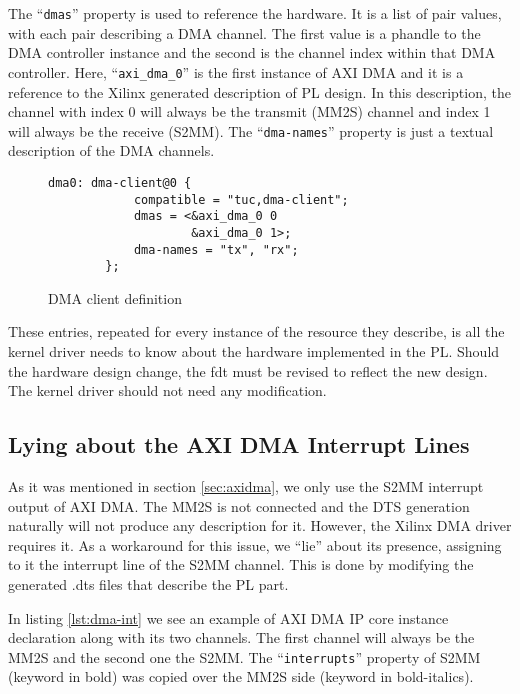 The ``\texttt{dmas}'' property is used to reference the hardware.
It is a list of pair values, with each pair describing a DMA channel.
The first value is a phandle to the DMA controller instance
and the second is the channel index within that DMA controller.
Here, ``\texttt{axi\_dma\_0}'' is the first instance of AXI DMA and it is a reference
to the Xilinx generated description of PL design. In this description, the channel with index 0
will always be the transmit (MM2S) channel and index 1 will always be the receive (S2MM).
The ``\texttt{dma-names}'' property is just a textual description of the DMA channels.

\begin{figure}[ht!]
\centering
\begin{lstlisting}[style=basic]
		dma0: dma-client@0 {
			compatible = "tuc,dma-client";
			dmas = <&axi_dma_0 0
					&axi_dma_0 1>;
			dma-names = "tx", "rx";
		};
\end{lstlisting}
\caption{DMA client definition}
\label{lst:dmaclient}
\end{figure}

These entries, repeated for every instance of the resource they describe, is all the kernel driver
needs to know about the hardware implemented in the PL.
Should the hardware design change, the \gls{fdt} must be revised to reflect the new design.
The kernel driver should not need any modification.

\subsection{Lying about the AXI DMA Interrupt Lines}

As it was mentioned in section \ref{sec:axidma}, we only use the S2MM interrupt output of AXI DMA.
The MM2S is not connected and the DTS generation naturally will not produce any description for it.
However, the Xilinx DMA driver requires it. As a workaround for this issue, we ``lie'' about its presence,
assigning to it the interrupt line of the S2MM channel. This is done by modifying the generated .dts files
that describe the PL part.

In listing \ref{lst:dma-int} we see an example of AXI DMA IP core
instance declaration along with its two channels.
The first channel will always be the MM2S and the second one the S2MM.
The ``\texttt{interrupts}'' property of S2MM (keyword in bold) was copied over
the MM2S side (keyword in bold-italics).

